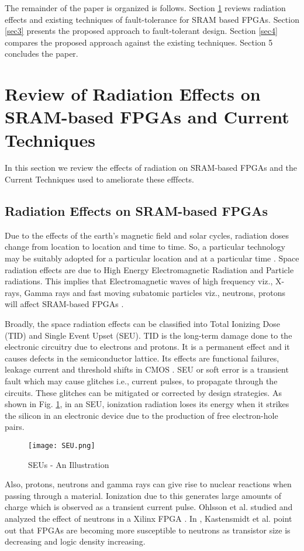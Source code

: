\documentclass[10pt,journal,cspaper,compsoc]{IEEEtran}
\begin{document}
The remainder of the paper is organized is follows. Section \ref{sec2} reviews radiation effects and  existing techniques of fault-tolerance for SRAM based FPGAs. Section \ref{sec3} presents the proposed approach to fault-tolerant design. Section \ref{sec4} compares the proposed approach against the existing techniques. Section 5 concludes the paper.
\section{Review of Radiation Effects on SRAM-based FPGAs and Current Techniques}\label{sec2}
In this section we review the effects of radiation on SRAM-based FPGAs and the Current Techniques used to ameliorate these efffects.
\subsection{Radiation Effects on SRAM-based FPGAs}
Due to the effects of the earth's magnetic field and solar cycles, radiation doses change from location to location and time to time. So, a particular technology may be suitably adopted for a particular location and at a particular time \cite{BuK,SSJZ,Sau}. Space radiation effects are due to High Energy Electromagnetic Radiation and Particle radiations. This implies that Electromagnetic waves of high frequency viz., X-rays, Gamma rays and fast moving subatomic particles viz., neutrons, protons will affect SRAM-based FPGAs \cite{AdA,BDS,BuG}.

Broadly, the space radiation effects can be classified into Total Ionizing Dose (TID) and Single Event Upset (SEU). TID is the long-term damage done to the electronic circuitry due to electrons and protons. It is a permanent effect and it causes defects in the semiconductor lattice. Its effects are functional failures, leakage current and threshold shifts in CMOS \cite{MGBG}. SEU or soft error is a transient fault which may cause glitches i.e., current pulses, to propagate through the circuits. These glitches can be mitigated or corrected by design strategies.
      As shown in Fig. \ref{fig1}, in an SEU, ionization radiation loses its energy when it strikes the silicon in an electronic device due to the production of free electron-hole pairs.
\begin{figure}[t]
  \caption{SEUs - An Illustration}\label{fig1}
\texttt{[image: SEU.png]}
\end{figure}
Also, protons, neutrons and gamma rays can give rise to nuclear reactions when passing through a material. Ionization due to this generates large amounts of charge which is observed as a transient current pulse. Ohlsson et al. studied and analyzed the effect of neutrons in a Xilinx FPGA \cite{Ol-et}. In \cite{KNHCR}, Kastensmidt et al. point out that FPGAs are becoming more susceptible to neutrons as transistor size is decreasing and logic density increasing.
\end{document}
